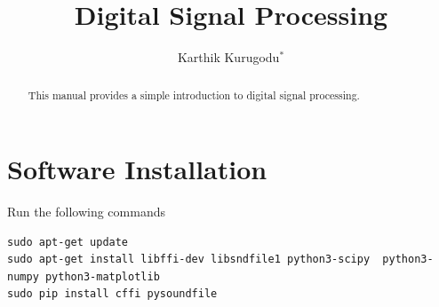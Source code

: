 \documentclass[journal,12pt,twocolumn]{IEEEtran}
\renewcommand\thesection{\arabic{section}}
\begin{document}
\newcommand{\mybvec}[1]{\ensuremath{\begin{bmatrix}#1\end{bmatrix}}}
\newcommand{\w}[2]{\ensuremath{W_{#1}^{#2}}}
\providecommand{\dec}[2]{\ensuremath{\overset{#1}{\underset{#2}{\gtrless}}}}
\let\vec\mathbf	
\makeatletter
{}
\makeatother
\let\StandardTheFigure\thefigure
\renewcommand{\thefigure}{\theproblem}
\def\putbox#1#2#3{\makebox[0in][l]{\makebox[#1][l]{}\raisebox{\baselineskip}[0in][0in]{\raisebox{#2}[0in][0in]{#3}}}}
     \def\rightbox#1{\makebox[0in][r]{#1}}
     \def\centbox#1{\makebox[0in]{#1}}
     \def\topbox#1{\raisebox{-\baselineskip}[0in][0in]{#1}}
     \def\midbox#1{\raisebox{-0.5\baselineskip}[0in][0in]{#1}}
\vspace{3cm}

\title{ 
Digital Signal Processing
}

\author{ Karthik Kurugodu$^{*}$ 
}


\maketitle


\tableofcontents


\renewcommand{\thefigure}{\theenumi}
\renewcommand{\thetable}{\theenumi}



\bigskip

\begin{abstract}
This manual provides a simple introduction to digital signal processing.
\end{abstract}
\section{Software Installation}
Run the following commands
\begin{lstlisting}
sudo apt-get update
sudo apt-get install libffi-dev libsndfile1 python3-scipy  python3-numpy python3-matplotlib 
sudo pip install cffi pysoundfile 
\end{lstlisting}
\end{document}
